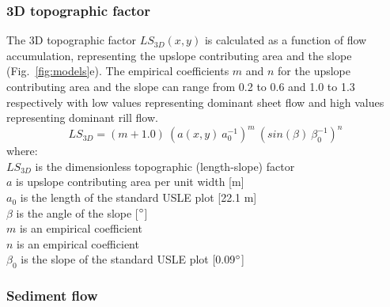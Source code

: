 \documentclass[gmd, manuscript]{copernicus}
\begin{document}

\subsubsection{3D topographic factor}
%
The 3D topographic factor $LS_{3D}(x,y)$
is calculated as a function of flow accumulation,
representing the upslope contributing area
and the slope 
(Fig.~\ref{fig:models}e). 
%
The empirical coefficients $m$ and $n$
for the upslope contributing area 
and the slope
can range from 0.2 to 0.6
and 1.0 to 1.3 respectively
with low values representing dominant sheet flow
and high values representing dominant rill flow.
%
\begin{equation}
\label{eq:ls_factor}
{LS_{3D} = (m+1.0) ~ (a(x,y) ~ a_0^{-1})^{m} ~ (sin(\beta) ~ \beta_0^{-1})^{n}}
\end{equation}
%
{\small
\noindent
where: \\
\noindent
\hspace*{0.5em} $LS_{3D}$ is the dimensionless topographic (length-slope) factor\\
\hspace*{0.5em} $a$ is upslope contributing area per unit width [\unit{m}]\\
\hspace*{0.5em} $a_0$ is the length of the standard USLE plot [22.1 \unit{m}]\\
\hspace*{0.5em} $\beta$ is the angle of the slope [$^{\circ}$]\\
\hspace*{0.5em} $m$ is an empirical coefficient\\
\hspace*{0.5em} $n$ is an empirical coefficient\\
\hspace*{0.5em} $\beta_0$ is the slope of the standard USLE plot [0.09$^{\circ}$]\\
}


\subsubsection{Sediment flow}
\end{document}
